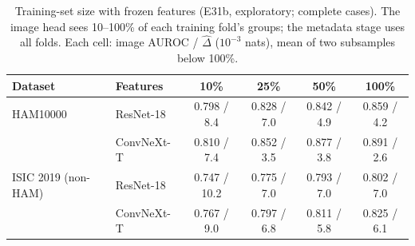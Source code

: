\begin{table}[tp]\centering\footnotesize
\caption{Training-set size with frozen features (E31b, exploratory; complete cases). The image head sees 10--100\% of each training fold's groups; the metadata stage uses all folds. Each cell: image AUROC / $\hat\Delta$ ($10^{-3}$ nats), mean of two subsamples below 100\%.}\label{tab:scaling}
\begin{tabular}{llcccc}\toprule
Dataset & Features & 10\% & 25\% & 50\% & 100\%\\\midrule
HAM10000 & ResNet-18 & 0.798 / 8.4 & 0.828 / 7.0 & 0.842 / 4.9 & 0.859 / 4.2\\
 & ConvNeXt-T & 0.810 / 7.4 & 0.852 / 3.5 & 0.877 / 3.8 & 0.891 / 2.6\\
ISIC 2019 (non-HAM) & ResNet-18 & 0.747 / 10.2 & 0.775 / 7.0 & 0.793 / 7.0 & 0.802 / 7.0\\
 & ConvNeXt-T & 0.767 / 9.0 & 0.797 / 6.8 & 0.811 / 5.8 & 0.825 / 6.1\\
\bottomrule\end{tabular}\end{table}
